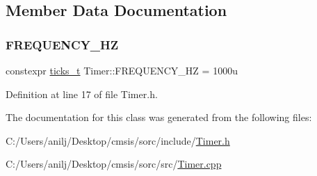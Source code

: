 \subsection{Member Data Documentation}
\mbox{\label{class_timer_afb0566d18137755123193fc239593daa}} 
\subsubsection{\texorpdfstring{F\+R\+E\+Q\+U\+E\+N\+C\+Y\+\_\+\+HZ}{FREQUENCY\_HZ}}
{\footnotesize\ttfamily constexpr \hyperlink{class_timer_af064c6652d9c7424aa2a69091077371d}{ticks\+\_\+t} Timer\+::\+F\+R\+E\+Q\+U\+E\+N\+C\+Y\+\_\+\+HZ = 1000u\hspace{0.3cm}{\ttfamily [static]}}



Definition at line 17 of file Timer.\+h.



The documentation for this class was generated from the following files\+:\begin{DoxyCompactItemize}
\item 
C\+:/\+Users/anilj/\+Desktop/cmsis/sorc/include/\hyperlink{_timer_8h}{Timer.\+h}\item 
C\+:/\+Users/anilj/\+Desktop/cmsis/sorc/src/\hyperlink{_timer_8cpp}{Timer.\+cpp}\end{DoxyCompactItemize}
